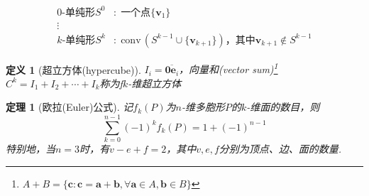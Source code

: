 \documentclass[11pt,UTF8]{ctexart}
\newtheorem{theorem}{定理}
\newtheorem{definition}{定义}
\def\vv{\mathbf{v}}
\def\conv{\mathrm{conv}\,}
\newcommand{\vb}[1]{\mathbf{#1}}
\begin{document}
\[\begin{aligned}
0\text{-单纯形} S^0 &:\; \text{一个点} \{\vv_1\}\\
\vdots\\
k\text{-单纯形} S^k &:\; \conv(S^{k-1}\cup\{\vv_{k+1}\})\text{，其中}\vv_{k+1}\notin S^{k-1}
\end{aligned}\]
\begin{definition}[超立方体(hypercube)]
\rm $I_i=\overline{\vb{0}\vb{e}_i}$，向量和(vector sum)\footnote{$A+B=\{\vb{c}:\vb{c}=\vb{a}+\vb{b},\forall\vb{a}\in A,\vb{b}\in B\}$}$C^k=I_1+I_2+\cdots+I_k$称为f$k$-维超立方体
\end{definition}
\begin{theorem}[欧拉(Euler)公式]
记$f_k(P)$为$n$-维多胞形$P$的$k$-维面的数目，则
\[\sum_{k=0}^{n-1}(-1)^kf_k(P)=1+(-1)^{n-1}\]
特别地，当$n=3$时，有$v-e+f=2$，其中$v,e,f$分别为顶点、边、面的数量.
\end{theorem}
\end{document}
